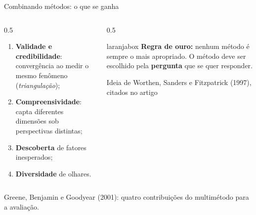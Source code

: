 \begin{frame}{Combinando métodos: o que se ganha}
  \begin{columns}[T]
    \begin{column}{0.5\textwidth}
      \begin{enumerate}
        \item \textbf{Validade e credibilidade}: convergência ao medir o mesmo fenômeno (\emph{triangulação});
        \item \textbf{Compreensividade}: capta diferentes dimensões sob perspectivas distintas;
        \item \textbf{Descoberta} de fatores inesperados;
        \item \textbf{Diversidade} de olhares.
      \end{enumerate}
    \end{column}
    \begin{column}{0.5\textwidth}
      \begin{beamercolorbox}[wd=\textwidth,rounded=true,sep=0.3cm]{laranjabox}
        \small
        \textbf{Regra de ouro:} nenhum método é sempre o mais apropriado. O método deve ser escolhido pela \textbf{pergunta} que se quer responder.
        \par\raggedleft\scriptsize Ideia de Worthen, Sanders e Fitzpatrick (1997), citados no artigo
      \end{beamercolorbox}
    \end{column}
  \end{columns}
  \vspace{0.3cm}
  \begin{center}
    \small Greene, Benjamin e Goodyear (2001): quatro contribuições do multimétodo para a avaliação.
  \end{center}
\end{frame}

